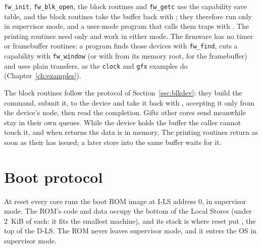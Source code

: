 \texttt{fw\_init}, \texttt{fw\_blk\_open}, the block routines and \texttt{fw\_getc} use the
capability save table, and the block routines take the buffer back with ; they therefore run
only in supervisor mode, and a user-mode program that calls them traps with . The printing
routines need only  and work in either mode. The firmware has no timer or framebuffer routines:
a program finds those devices with \texttt{fw\_find}, cuts a capability with \texttt{fw\_window} (or
with  from its memory root, for the framebuffer) and uses plain transfers, as the
\texttt{clock} and \texttt{gfx} examples do (Chapter~\ref{ch:examples}).

The block routines follow the protocol of Section~\ref{sec:blkdev}: they build the command, submit it,
  to the device and take it back with , accepting it only from
the device's node, then read the completion. Gifts other cores send meanwhile stay in their own queues. While the device
holds the buffer the caller cannot touch it, and when  returns the data is in memory. The
printing routines return as soon as their  has issued; a later store into the same buffer
waits for it.

\section{Boot protocol}\label{sec:boot}

At reset every core runs the boot ROM image at I-LS address 0, in supervisor mode. The ROM's code and
data occupy the bottom of the Local Stores (under 2~KiB of each: it fits the smallest machine), and its
stack is where reset put , the top of the D-LS. The ROM never leaves supervisor mode, and it
enters the OS in supervisor mode.

